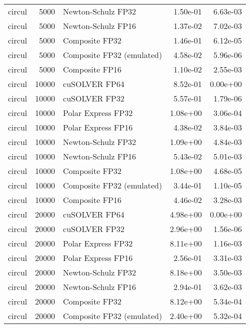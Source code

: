 \begin{table}
\begin{tabular}{lrlrr}
   circul &  5000 &        Newton-Schulz FP32 &  1.50e-01 &        6.63e-03 \\
   circul &  5000 &        Newton-Schulz FP16 &  1.37e-02 &        7.02e-03 \\
   circul &  5000 &            Composite FP32 &  1.46e-01 &        6.12e-05 \\
   circul &  5000 & Composite FP32 (emulated) &  4.58e-02 &        5.96e-06 \\
   circul &  5000 &            Composite FP16 &  1.10e-02 &        2.55e-03 \\
   circul & 10000 &             cuSOLVER FP64 &  8.52e-01 &        0.00e+00 \\
   circul & 10000 &             cuSOLVER FP32 &  5.57e-01 &        1.79e-06 \\
   circul & 10000 &        Polar Express FP32 &  1.08e+00 &        3.06e-04 \\
   circul & 10000 &        Polar Express FP16 &  4.38e-02 &        3.84e-03 \\
   circul & 10000 &        Newton-Schulz FP32 &  1.09e+00 &        4.84e-03 \\
   circul & 10000 &        Newton-Schulz FP16 &  5.43e-02 &        5.01e-03 \\
   circul & 10000 &            Composite FP32 &  1.08e+00 &        4.68e-05 \\
   circul & 10000 & Composite FP32 (emulated) &  3.44e-01 &        1.10e-05 \\
   circul & 10000 &            Composite FP16 &  4.46e-02 &        3.28e-03 \\
   circul & 20000 &             cuSOLVER FP64 &  4.98e+00 &        0.00e+00 \\
   circul & 20000 &             cuSOLVER FP32 &  2.96e+00 &        1.56e-06 \\
   circul & 20000 &        Polar Express FP32 &  8.11e+00 &        1.16e-03 \\
   circul & 20000 &        Polar Express FP16 &  2.56e-01 &        3.31e-03 \\
   circul & 20000 &        Newton-Schulz FP32 &  8.18e+00 &        3.50e-03 \\
   circul & 20000 &        Newton-Schulz FP16 &  2.94e-01 &        3.62e-03 \\
   circul & 20000 &            Composite FP32 &  8.12e+00 &        5.34e-04 \\
   circul & 20000 & Composite FP32 (emulated) &  2.40e+00 &        5.32e-04 \\

\end{tabular}
\end{table}
